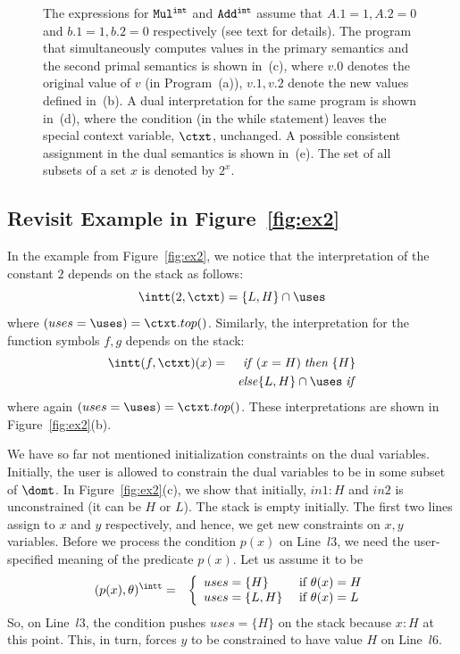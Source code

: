 \documentclass[preprint]{sig-alternate-05-2015}
\def\int{{\tt{int}}}
\def\MMul{{\mathtt{Mul}}}
\def\VAdd{{\mathtt{Add}}}
\def\iteif{{\mathit{if}}}
\def\itethen{{\mathit{then}}}
\def\iteelse{{\mathit{else}}}
\def\itefi{{\mathit{if}}}
\begin{document}
{\begin{figure}[htp]
{  The expressions for $\MMul^\int$ and $\VAdd^\int$ assume that
  $A.1=1, A.2=0$ and $b.1=1,b.2=0$ respectively (see text for details).
  The program that simultaneously computes values in the primary semantics
  and the second primal semantics is shown in~(c), where $v.0$ denotes the
  original value of $v$ (in Program~(a)), $v.1,v.2$ denote the new values
  defined in~(b).
  A dual interpretation for the same program is shown in~(d), where
the condition (in the while statement) leaves the special context variable, $\ctxt$, unchanged. A possible consistent assignment in the dual semantics is shown in~(e). The set of all subsets of a set $x$ is denoted by $2^{x}$.}
  \label{fig:ex3}
\end{figure}


\subsection{Revisit Example in Figure~\ref{fig:ex2}}

In the example from Figure~\ref{fig:ex2}, we notice that
the interpretation of the constant $2$ depends on the stack as follows:
$$
 \intt(2,\ctxt) = \{L,H\}\cap \uses
$$
where $(uses=\uses) = \ctxt.top()$.
Similarly, the interpretation for the function symbols $f,g$ depends on
the stack:
\begin{eqnarray*}
 \intt(f,\ctxt)(x) & = & \iteif \; (x=H) \; \itethen \; \{H\}
\\ & & \iteelse \{L,H\}\cap \uses \; \itefi
\end{eqnarray*}
where again $(uses=\uses) = \ctxt.top()$.
These interpretations are shown in Figure~\ref{fig:ex2}(b).

We have so far not mentioned initialization constraints on the dual variables.
Initially, the user is allowed to constrain the dual variables to be in some subset of $\domt$.
In Figure~\ref{fig:ex2}(c), we show that initially, $in1: H$ and
$in2$ is unconstrained (it can be $H$ or $L$).
The stack is empty initially.
The first two lines assign to $x$ and $y$ respectively, and
hence, we get new constraints on $x,y$ variables.
Before we process the condition $p(x)$ on Line~$l3$, we need the user-specified
meaning of the predicate $p(x)$. Let us assume it to be
\begin{eqnarray*}
 (p(x),\theta)^\intt & = & \left\{
  \begin{array}{ll}
    uses=\{H\} & \mbox{ if $\theta(x)=H$} \\
    uses=\{L,H\} & \mbox{ if $\theta(x)=L$}
  \end{array}
  \right.
\end{eqnarray*}
So, on Line~$l3$, the condition pushes
$uses = \{H\}$ on the stack because $x:H$ at this point.
This, in turn, forces $y$ to be constrained to have value $H$ on Line~$l6$.


}
\end{document}

